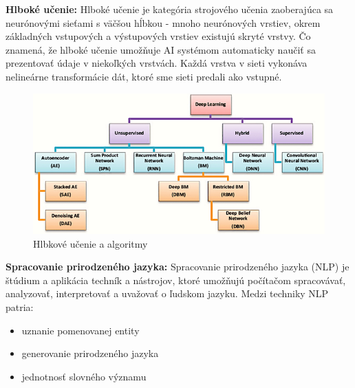\textbf{Hlboké učenie:} Hlboké učenie je kategória strojového učenia zaoberajúca sa neurónovými sieťami s väčšou hĺbkou - mnoho neurónových vrstiev, okrem základných vstupových a výstupových vrstiev existujú skryté vrstvy. Čo znamená, že hlboké učenie umožňuje AI systémom automaticky naučiť sa prezentovať údaje v niekoľkých vrstvách. Každá vrstva v sieti vykonáva nelineárne transformácie dát, ktoré sme sieti predali ako vstupné. \cite{glos_prace_kristian}
\\

\begin{figure}[!ht]
    \centering
    \includegraphics[width=1\textwidth]{figures/hlbkove-ucenie.png}
    \caption{Hlbkové učenie a algoritmy}
\end{figure}

\textbf{Spracovanie prirodzeného jazyka:} Spracovanie prirodzeného jazyka (NLP) je štúdium a aplikácia techník a nástrojov, ktoré umožňujú počítačom spracovávať, analyzovať, interpretovať a uvažovať o ľudskom jazyku. \cite{nelson_nlp} Medzi techniky NLP patria:

\begin{itemize}
    \item uznanie pomenovanej entity
    \item generovanie prirodzeného jazyka
    \item jednotnosť slovného významu
\end{itemize} 

